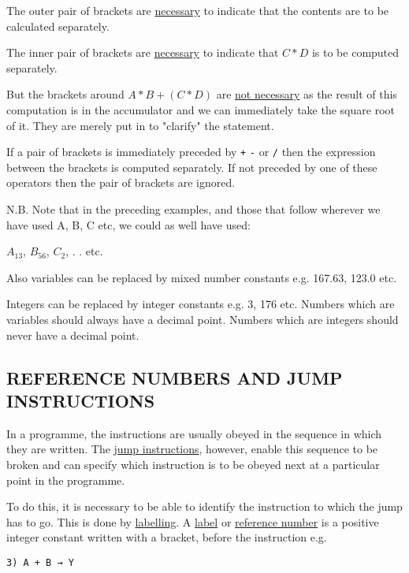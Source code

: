\documentclass[10pt, a4paper, oneside]{article}
\newcommand{\myuline}[1]{\uline{#1}}
\newcommand{\mytt}[1]{\texttt{\footnotesize #1}}
\begin{document}
\begin{multicols}{2}
The outer pair of brackets are \myuline{necessary} to
indicate that the contents are to be calculated
separately.

The inner pair of brackets are \myuline{necessary} to
indicate that $C * D$ is to be computed separately.

But the brackets around $A * B + (C * D)$ are
\myuline{not necessary} as the result of this computation is in
the accumulator and we can immediately take the square
root of it.  They are merely put in to "clarify" the
statement.

If a pair of brackets is immediately preceded
by \mytt{+} \mytt{-} \mytt{*} or \mytt{/} then the expression between the brackets
is computed separately.  If not preceded by one of
these operators then the pair of brackets are ignored.

N.B. Note that in the preceding examples,
and those that follow wherever we have used A, B, C
etc, we could as well have used:

\begin{addmargin}[1cm]{1em}%
$A_{13}$, $B_{56}$, $C_{2}$, . . etc.
\end{addmargin}

Also variables can be replaced by mixed
number constants e.g. 167.63, 123.0 etc.

Integers can be replaced by integer
constants e.g. 3, 176 etc.  Numbers which are
variables should always have a decimal point.  Numbers
which are integers should never have a decimal point.


\subsection{REFERENCE NUMBERS AND JUMP INSTRUCTIONS}\label{sec:REFJMP}

In a programme, the instructions are usually
obeyed in the sequence in which they are written.  The
\myuline{jump instructions}, however, enable this sequence to be
broken and can specify which instruction is to be
obeyed next at a particular point in the programme.

To do this, it is necessary to be able to
identify the instruction to which the jump has to go.
This is done by \myuline{labelling}.  A \myuline{label} or \myuline{reference number}
is a positive integer constant written with a
bracket, before the instruction e.g.

\begin{addmargin}[1cm]{1em}%
\begin{lstlisting}
3) A + B → Y
\end{lstlisting}
\end{addmargin}


\end{multicols}
\end{document}
